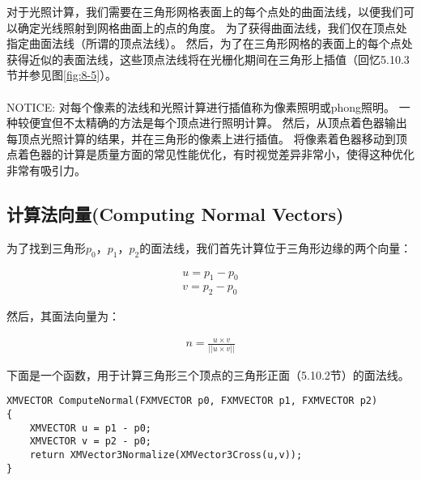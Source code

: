 \begin{flushleft}
对于光照计算，我们需要在三角形网格表面上的每个点处的曲面法线，以便我们可以确定光线照射到网格曲面上的点的角度。 为了获得曲面法线，我们仅在顶点处指定曲面法线（所谓的顶点法线）。 然后，为了在三角形网格的表面上的每个点处获得近似的表面法线，这些顶点法线将在光栅化期间在三角形上插值（回忆5.10.3节并参见图\ref{fig:8-5}）。\\
~\\
NOTICE: 对每个像素的法线和光照计算进行插值称为像素照明或phong照明。 一种较便宜但不太精确的方法是每个顶点进行照明计算。 然后，从顶点着色器输出每顶点光照计算的结果，并在三角形的像素上进行插值。 将像素着色器移动到顶点着色器的计算是质量方面的常见性能优化，有时视觉差异非常小，使得这种优化非常有吸引力。\\
\end{flushleft}

\subsection{计算法向量(Computing Normal Vectors)}
\begin{flushleft}
为了找到三角形$p_{0}$，$p_{1}$，$p_{2}$的面法线，我们首先计算位于三角形边缘的两个向量：\\
\end{flushleft}

\begin{align*}
u=p_{1}-p_{0}\\
v=p_{2}-p_{0}
\end{align*}

\begin{flushleft}
然后，其面法向量为：\\
\end{flushleft}

\begin{align*}
n=\frac{u\times v}{||u\times v||}
\end{align*}

\begin{flushleft}
下面是一个函数，用于计算三角形三个顶点的三角形正面（5.10.2节）的面法线。\\
\end{flushleft}

\begin{lstlisting}
XMVECTOR ComputeNormal(FXMVECTOR p0, FXMVECTOR p1, FXMVECTOR p2)
{
    XMVECTOR u = p1 - p0;
    XMVECTOR v = p2 - p0;
    return XMVector3Normalize(XMVector3Cross(u,v));
}
\end{lstlisting}

